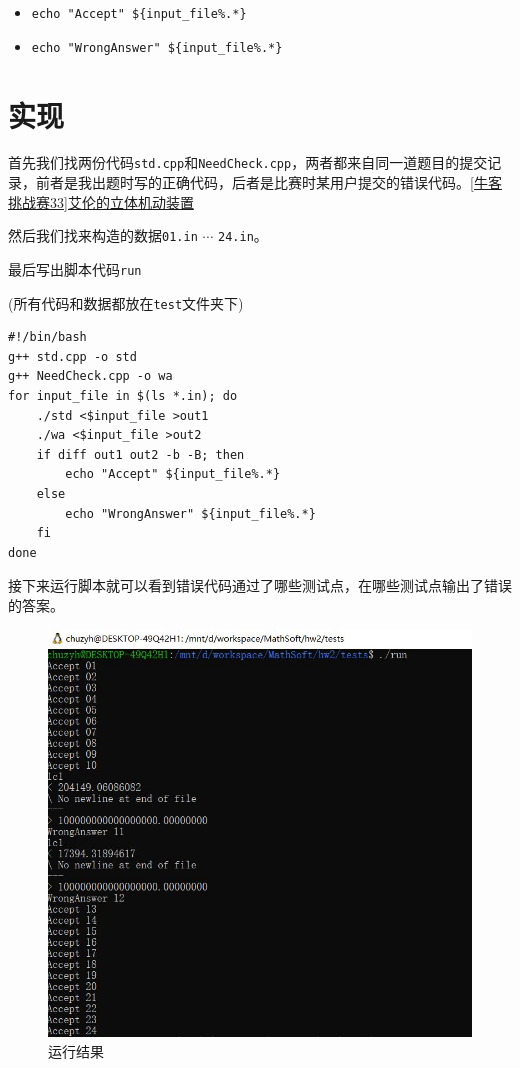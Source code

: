 \documentclass{article}
\begin{document}
        \begin{itemize}
            \item \verb|echo "Accept" ${input_file%.*}|
            \item \verb|echo "WrongAnswer" ${input_file%.*}|
        \end{itemize}

\section{实现}
    首先我们找两份代码\verb|std.cpp|和\verb|NeedCheck.cpp|，两者都来自同一道题目的提交记录，前者是我出题时写的正确代码，后者是比赛时某用户提交的错误代码。\href{https://ac.nowcoder.com/acm/contest/1115/C}{[牛客挑战赛33]艾伦的立体机动装置}

    然后我们找来构造的数据\verb|01.in| $\cdots$ \verb|24.in|。

    最后写出脚本代码\verb|run|

    (所有代码和数据都放在\verb|test|文件夹下)
\begin{verbatim}
#!/bin/bash
g++ std.cpp -o std
g++ NeedCheck.cpp -o wa
for input_file in $(ls *.in); do
	./std <$input_file >out1
	./wa <$input_file >out2
	if diff out1 out2 -b -B; then
		echo "Accept" ${input_file%.*}
	else 
		echo "WrongAnswer" ${input_file%.*}
	fi
done
\end{verbatim}

    接下来运行脚本就可以看到错误代码通过了哪些测试点，在哪些测试点输出了错误的答案。

    \begin{figure}[H]
        \centering
        \includegraphics[scale=0.8]{result.JPG}
        \caption{运行结果}
      \end{figure}
\end{document}
